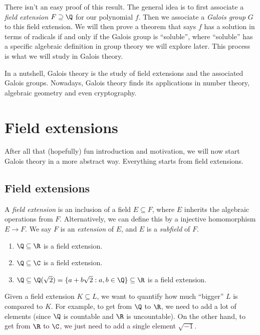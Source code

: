 \documentclass[a4paper]{article}
\begin{document}
There isn't an easy proof of this result. The general idea is to first associate a \emph{field extension} $F \supseteq \Q$ for our polynomial $f$. Then we associate a \emph{Galois group} $G$ to this field extension. We will then prove a theorem that says $f$ has a solution in terms of radicals if and only if the Galois group is ``soluble'', where ``soluble'' has a specific algebraic definition in group theory we will explore later. This process is what we will study in Galois theory.

In a nutshell, Galois theory is the study of field extensions and the associated Galois groups. Nowadays, Galois theory finds its applications in number theory, algebraic geometry and even cryptography.

\section{Field extensions}
After all that (hopefully) fun introduction and motivation, we will now start Galois theory in a more abstract way. Everything starts from field extensions.

\subsection{Field extensions}
\begin{defi}
  A \emph{field extension} is an inclusion of a field $E\subseteq F$, where $E$ inherits the algebraic operations from $F$. Alternatively, we can define this by a injective homomorphism $E\to F$. We say $F$ is an \emph{extension} of $E$, and $E$ is a \emph{subfield} of $F$.
\end{defi}

\begin{eg}\leavevmode
  \begin{enumerate}
    \item $\Q\subseteq \R$ is a field extension.
    \item $\Q \subseteq \C$ is a field extension.
    \item $\Q\subseteq \Q(\sqrt{2}) = \{a + b\sqrt{2}: a, b\in \Q\} \subseteq \R$ is a field extension.
  \end{enumerate}
\end{eg}

Given a field extension $K\subseteq L$, we want to quantify how much ``bigger'' $L$ is compared to $K$. For example, to get from $\Q$ to $\R$, we need to add a lot of elements (since $\Q$ is countable and $\R$ is uncountable). On the other hand, to get from $\R$ to $\C$, we just need to add a single element $\sqrt{-1}$.
\end{document}
